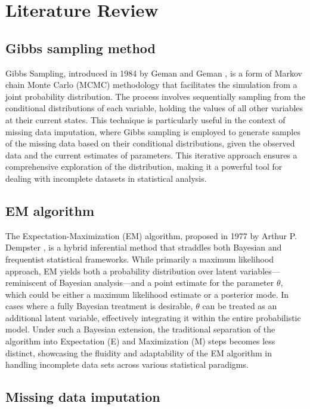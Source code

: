 \documentclass[12pt]{article}
\begin{document}
\section{Literature Review}

\subsection{Gibbs sampling method}

Gibbs Sampling, introduced in 1984 by Geman and Geman \cite{Geman1984}, is a form of Markov chain Monte Carlo (MCMC) methodology that facilitates the simulation from a joint probability distribution. The process involves sequentially sampling from the conditional distributions of each variable, holding the values of all other variables at their current states. This technique is particularly useful in the context of missing data imputation, where Gibbs sampling is employed to generate samples of the missing data based on their conditional distributions, given the observed data and the current estimates of parameters. This iterative approach ensures a comprehensive exploration of the distribution, making it a powerful tool for dealing with incomplete datasets in statistical analysis.

\subsection{EM algorithm}

The Expectation-Maximization (EM) algorithm, proposed in 1977 by Arthur P. Dempster \cite{Dempster1977}, is a hybrid inferential method that straddles both Bayesian and frequentist statistical frameworks. While primarily a maximum likelihood approach, EM yields both a probability distribution over latent variables—reminiscent of Bayesian analysis—and a point estimate for the parameter $\theta$, which could be either a maximum likelihood estimate or a posterior mode. In cases where a fully Bayesian treatment is desirable, $\theta$ can be treated as an additional latent variable, effectively integrating it within the entire probabilistic model. Under such a Bayesian extension, the traditional separation of the algorithm into Expectation (E) and Maximization (M) steps becomes less distinct, showcasing the fluidity and adaptability of the EM algorithm in handling incomplete data sets across various statistical paradigms.

\subsection{Missing data imputation}
\end{document}
